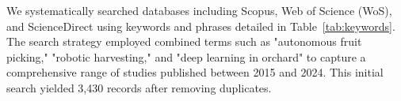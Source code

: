 \documentclass{ieeeaccess}
\begin{document}
We systematically searched databases including Scopus, Web of Science (WoS), and ScienceDirect using keywords and phrases detailed in Table~\ref{tab:keywords}. The search strategy employed combined terms such as "autonomous fruit picking," "robotic harvesting," and "deep learning in orchard" to capture a comprehensive range of studies published between 2015 and 2024. This initial search yielded 3,430 records after removing duplicates.

\end{document}
